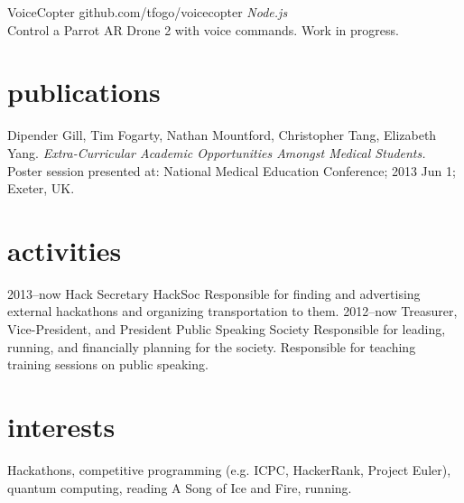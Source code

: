 \documentclass[]{friggeri-cv} %
\begin{document}
\begin{entrylist}
\entry
{}
{VoiceCopter}
{github.com/tfogo/voicecopter}
{\emph{Node.js} \\
Control a Parrot AR Drone 2 with voice commands. Work in progress.}
\end{entrylist}

\section{\color{brown}publications}

{Dipender Gill, Tim Fogarty, Nathan Mountford, Christopher Tang, Elizabeth Yang. \emph{Extra-Curricular Academic Opportunities Amongst Medical Students.} Poster session presented at: National Medical Education Conference; 2013 Jun 1; Exeter, UK.}

\newpage

\section{\color{green}activities}

\begin{entrylist}
\entry
{2013--now}
{Hack Secretary}
{HackSoc}
{Responsible for finding and advertising external hackathons and organizing transportation to them.}
\entry
{2012--now}
{Treasurer, Vice-President, and President}
{Public Speaking Society}
{Responsible for leading, running, and financially planning for the society. Responsible for teaching training sessions on public speaking.}
\end{entrylist}


\section{\color{purple}interests}

Hackathons, competitive programming (e.g. ICPC, HackerRank, Project Euler), quantum computing, reading A Song of Ice and Fire, running.
\end{document}
